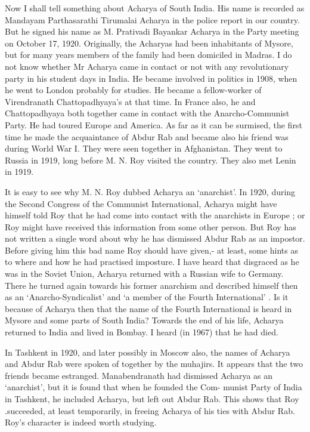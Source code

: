 Now I shall tell something about Acharya of South India. His name is recorded as Mandayam Parthasarathi Tirumalai Acharya in the police report in our country. But he signed his name as M. Prativadi Bayankar Acharya in the Party meeting on October 17, 1920. Originally, the Acharyas had been inhabitants of Mysore, but for many years members of the family had been domiciled in Madras. I do not know whether Mr Acharya came in contact or not with any revolutionary party in his student days in India. He became involved in politics in 1908, when he went to London probably for studies. He became a fellow-worker of Virendranath Chattopadhyaya’s at that time. In France also, he and Chattopadhyaya both together came in contact with the Anarcho-Communist Party. He had toured Europe and America. As far as it can be surmised, the first time he made the acquaintance of Abdur Rab and became also his friend was during World War I. They were seen together in Afghanistan. They went to Russia in 1919, long before M. N. Roy visited the country. They also met Lenin in 1919. 

It is easy to see why M. N. Roy dubbed Acharya an ‘anarchist’. In 1920, during the Second Congress of the Communist International, Acharya might have himself told Roy that he had come into contact with the anarchists in Europe ; or Roy might have received this information from 
some other person. But Roy has not written a single word about why he has dismissed Abdur Rab as an impostor. Before giving him this bad name Roy should have given,- at least, some hints as to where and how he had practised imposture. I have heard that disgraced as he was in the Soviet Union, Acharya returned with a Russian wife to Germany. There he turned again towards his former anarchism and described himself then as an ‘Anarcho-Syndicalist’ and ‘a member of the Fourth International’ . Is it because of Acharya then that the name of the Fourth International is heard in Mysore and some parts of South India? Towards the end of his life, Acharya returned to India and lived in Bombay. I 
heard (in 1967) that he had died.

In Tashkent in 1920, and later possibly in Moscow also, the names of Acharya and Abdur Rab were spoken of together by the muhajirs. It appears that the two friends became estranged. Manabendranath had dismissed Acharya as an ‘anarchist’, but it is found that when he founded the Com- 
munist Party of India in Tashkent, he included Acharya, but left out Abdur Rab. This shows that Roy .succeeded, at least temporarily, in freeing Acharya of his ties with Abdur Rab. Roy's character is indeed worth studying. 

